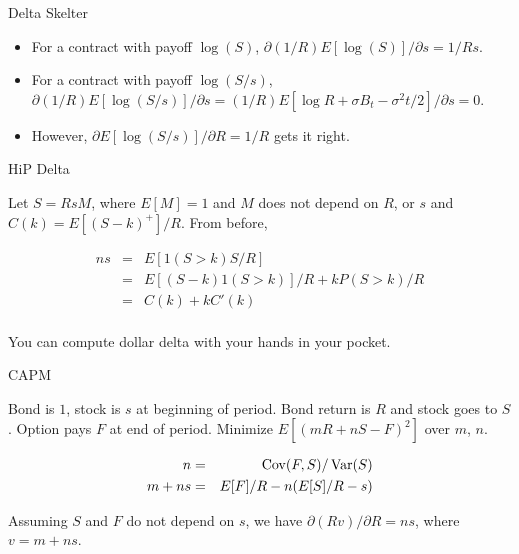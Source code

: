 \documentclass[fleqn]{amsart}
\def\Var{\mathop{\rm Var}}
\def\Cov{\mathop{\rm Cov}}
\begin{document}
\begin{section}{Delta Skelter}

\begin{itemize}

\item
For a contract with payoff $\log(S)$,
$\partial (1/R) E[\log(S)]/\partial s = 1/Rs$.

\item
For a contract with payoff $\log(S/s)$,
$\partial (1/R) E[\log(S/s)]/\partial s
= (1/R) E[\log R + \sigma B_t - \sigma^2t/2]/\partial s = 0$.

\item However, $\partial E[\log(S/s)]/\partial R = 1/R$ gets it right.

\end{itemize}

\end{section}

\begin{section}{HiP Delta}

Let $S = RsM$, where $E[M] = 1$ and $M$ does not depend on
$R$, or $s$ and $C(k) = E[(S  - k)^+]/R$. From before,

\begin{eqnarray*}
ns &=& E[1(S > k) S/R]\\
	&=& E[(S - k)1(S > k)]/R + k P(S > k)/R\\
	&=& C(k) + k C'(k)\\
\end{eqnarray*}

You can compute dollar delta with your hands in your pocket. 

\end{section}

\begin{section}{CAPM}

Bond is $1$, stock is $s$ at beginning of period. Bond return
is $R$ and stock goes to $S$. Option pays $F$ at end of period.
Minimize $E[(mR + nS - F)^2]$ over $m$, $n$.

\begin{eqnarray*}
n &=& \Cov(F,S)/\Var(S)\\
m + ns &=& E[F]/R - n (E[S]/R - s)\\
\end{eqnarray*}

Assuming $S$ and $F$ do not depend on $s$, we have
$\partial(Rv)/\partial R = ns$, where $v = m + ns$.

\end{section}
\end{document}
